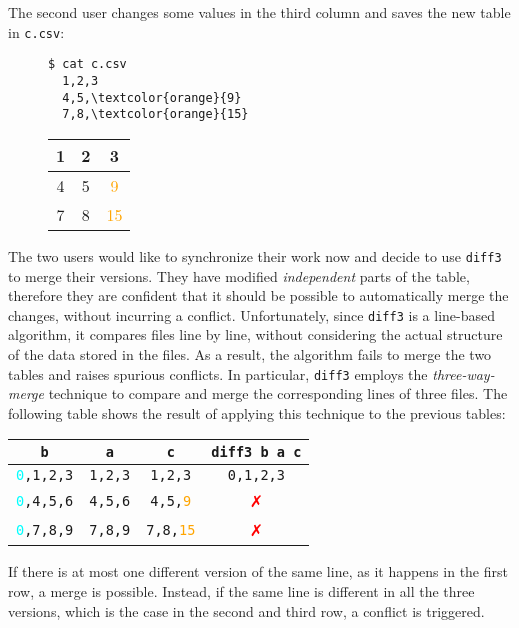 \documentclass{sigplanconf}
\theoremstyle{plain}
\begin{document}
The second user changes some values in the third column and saves the new table in  \texttt{c.csv}:
\begin{figure}[h]
\centering
\begin{minipage}{.15\textwidth}
  \centering
  \begin{Verbatim}[commandchars=\\\{\}]
  $ cat c.csv
  1,2,3
  4,5,\textcolor{orange}{9}
  7,8,\textcolor{orange}{15}
  \end{Verbatim}
\end{minipage}%
\begin{minipage}{.15\textwidth}
  \centering
  \begin{tabular}{ | c | c | c | }
    \hline
    1 & 2 & 3 \\ \hline
    4 & 5 & \textcolor{orange}{9} \\ \hline
    7 & 8 & \textcolor{orange}{15} \\ \hline
  \end{tabular}
\end{minipage}%
\end{figure}

The two users would like to synchronize their work now and decide to
use \texttt{diff3} to merge their versions.
%
They have modified \emph{independent} parts of the table, therefore
they are confident that it should be possible to automatically
merge the changes, without incurring a conflict.
%
Unfortunately, since \texttt{diff3} is a line-based algorithm, it
compares files line by line, without considering the actual structure
of the data stored in the files. 
%
As a result, the algorithm fails to merge the two tables and raises
spurious conflicts.
%
In particular, \texttt{diff3} employs the \emph{three-way-merge}
technique to compare and merge the corresponding lines of three files.
%
The following table shows the result of applying this technique to the
previous tables:
\begin{center}
\begin{tabular}{| c | c | c | c |}
\hline
\texttt{b} & \texttt{a} & \texttt{c} & \texttt{diff3 b a c} \\ \hline
\texttt{\textcolor{cyan}{0},1,2,3} & \texttt{1,2,3} & \texttt{1,2,3} & \textcolor{dgreen}{\texttt{0,1,2,3}} \\ \hline
\texttt{\textcolor{cyan}{0},4,5,6} & \texttt{4,5,6} & \texttt{4,5,\textcolor{orange}{9}} & \textcolor{red}{✗}  \\ \hline
\texttt{\textcolor{cyan}{0},7,8,9} & \texttt{7,8,9} & \texttt{7,8,\textcolor{orange}{15}} & \textcolor{red}{✗} \\ \hline
\end{tabular}
\end{center}
If there is at most one different version of the same line, as it
happens in the first row, a merge is possible.
%
Instead, if the same line is different in all the three versions,
which is the case in the second and third row, a conflict is
triggered.
%
\end{document}
